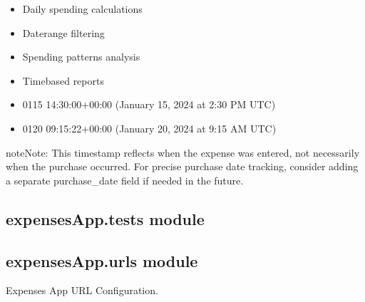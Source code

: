 \documentclass[letterpaper,10pt,english]{sphinxmanual}
\begin{document}
\begin{fulllineitems}
\begin{fulllineitems}
\begin{description}
\begin{itemize}
\item {} 
\sphinxAtStartPar
Daily spending calculations

\item {} 
\sphinxAtStartPar
Date\sphinxhyphen{}range filtering

\item {} 
\sphinxAtStartPar
Spending patterns analysis

\item {} 
\sphinxAtStartPar
Time\sphinxhyphen{}based reports

\end{itemize}

\begin{itemize}
\item {} 
\sphinxhyphen{}01\sphinxhyphen{}15 14:30:00+00:00 (January 15, 2024 at 2:30 PM UTC)

\item {} 
\sphinxhyphen{}01\sphinxhyphen{}20 09:15:22+00:00 (January 20, 2024 at 9:15 AM UTC)

\end{itemize}

\end{description}

\begin{sphinxadmonition}{note}{Note:}
\sphinxAtStartPar
This timestamp reflects when the expense was entered,
not necessarily when the purchase occurred. For precise
purchase date tracking, consider adding a separate
purchase\_date field if needed in the future.
\end{sphinxadmonition}

\end{fulllineitems}


\end{fulllineitems}



\subsection{expensesApp.tests module}
\label{\detokenize{expensesApp:module-expensesApp.tests}}\label{\detokenize{expensesApp:expensesapp-tests-module}}

\subsection{expensesApp.urls module}
\label{\detokenize{expensesApp:module-expensesApp.urls}}\label{\detokenize{expensesApp:expensesapp-urls-module}}
\sphinxAtStartPar
Expenses App URL Configuration.
\end{document}
